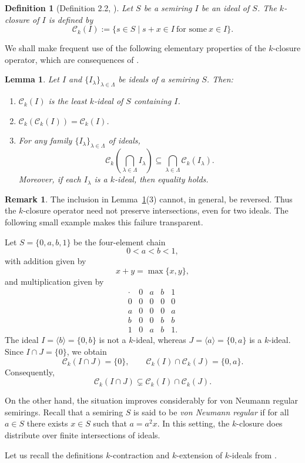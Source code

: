 \documentclass[11pt,leqno]{amsart}
\newtheorem{lemma}[theorem]{Lemma}
\theoremstyle{definition}
\newtheorem{definition}[theorem]{Definition}
\newtheorem{remark}[theorem]{Remark}
\numberwithin{equation}{section}
\begin{document}
\begin{definition}[Definition 2.2, \cite{GoswamiDube24}]
    \textit{Let $S$ be a semiring $I$ be an ideal of $S$. The $k$-closure of $I$ is defined by
    \[\mathcal{C}_k(I) :=\{s\in S\mid s+x\in I\ \text{for some} \ x\in I\}.\]}
\end{definition}

We shall make frequent use of the following elementary properties of the
$k$-closure operator, which are consequences of \cite[Lemma~2.3]{GoswamiDube24}.

\begin{lemma}\label{lem:properties of k-closure}
	Let $I$ and $\{I_\lambda\}_{\lambda\in\Lambda}$ be ideals of a semiring $S$.
	Then:
	\begin{enumerate}
		\item $\mathcal{C}_k(I)$ is the least $k$-ideal of $S$ containing $I$.
		
		\item $\mathcal{C}_k(\mathcal{C}_k(I))=\mathcal{C}_k(I)$.
		
		\item For any family $\{I_\lambda\}_{\lambda\in\Lambda}$ of ideals,
		\[
		\mathcal{C}_k\left(\bigcap_{\lambda\in\Lambda} I_\lambda\right)
		\subseteq
		\bigcap_{\lambda\in\Lambda}\mathcal{C}_k(I_\lambda).
		\]
		Moreover, if each $I_\lambda$ is a $k$-ideal, then equality holds.
	\end{enumerate}
\end{lemma}

\begin{remark}\label{C_k fails}
	The inclusion in Lemma~\ref{lem:properties of k-closure}(3) cannot, in
	general, be reversed. Thus the $k$-closure operator need not preserve
	intersections, even for two ideals. The following small example makes this
	failure transparent.
	
	Let $S=\{0,a,b,1\}$ be the four-element chain
	\[
	0<a<b<1,
	\]
	with addition given by
	\[
	x+y=\max\{x,y\},
	\]
	and multiplication given by
	\[
	\begin{array}{c|cccc}
		\cdot & 0&a&b&1\\ \hline
		0&0&0&0&0\\
		a&0&0&0&a\\
		b&0&0&b&b\\
		1&0&a&b&1.
	\end{array}
	\]
	The ideal $I=\langle b\rangle=\{0,b\}$ is not a $k$-ideal, whereas
	$J=\langle a\rangle=\{0,a\}$ is a $k$-ideal. Since $I\cap J=\{0\}$, we
	obtain
	\[
	\mathcal{C}_k(I\cap J)=\{0\},
	\qquad
	\mathcal{C}_k(I)\cap\mathcal{C}_k(J)=\{0,a\}.
	\]
	Consequently,
	\[
	\mathcal{C}_k(I\cap J)
	\subsetneq
	\mathcal{C}_k(I)\cap\mathcal{C}_k(J).
	\]
	
	
	On the other hand, the situation improves considerably for von Neumann
	regular semirings. Recall that a semiring $S$ is said to be \emph{von Neumann regular} if for all $a\in S$ there exists $x\in S$ such that $a=a^2x$. In this setting, the $k$-closure does distribute over
	finite intersections of ideals. 
\end{remark}
Let us recall the definitions $k$-contraction and $k$-extension of $k$-ideals from \cite[Definition 4.1]{GoswamiDube24}.
\end{document}
